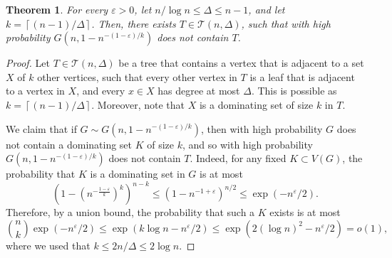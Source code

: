 \documentclass{article}
\theoremstyle{plain}
\newtheorem{theorem}{Theorem}[section]
\theoremstyle{definition}
\numberwithin{equation}{section}
\def\eps{\varepsilon}
\newcommand\ceil[1]{\left\lceil#1\right\rceil}
\newcommand\cT{\mathcal{T}}
\begin{document}


\begin{theorem}\label{thm:random}
For every $\eps>0$, let $n/\log n\leq\Delta\leq n-1$, and let $k=\ceil{(n-1)/\Delta}$. Then, there exists $T\in\cT(n,\Delta)$, such that with high probability $G(n,1-n^{-(1-\eps)/k})$ does not contain $T$.
\end{theorem}
\begin{proof}%
Let $T\in\cT(n,\Delta)$ be a tree that contains a vertex that is adjacent to a set $X$ of $k$ other vertices, such that every other vertex in $T$ is a leaf that is adjacent to a vertex in $X$, and every $x\in X$ has degree at most $\Delta$. This is possible as $k=\ceil{(n-1)/\Delta}$. Moreover, note that $X$ is a dominating set of size $k$ in $T$.

We claim that if $G\sim G(n,1-n^{-(1-\eps)/k})$, then with high probability $G$ does not contain a dominating set $K$ of size $k$, and so with high probability $G(n,1-n^{-(1-\eps)/k})$ does not contain $T$. 
Indeed, for any fixed $K\subset V(G)$, the probability that $K$ is a dominating set in $G$ is at most
\[\left(1-\left(n^{-\frac{1-\eps}k}\right)^k\right)^{n-k}\leq\left(1-n^{-1+\eps}\right)^{n/2}\leq \exp\left(-n^{\eps}/2\right).\]
Therefore, by a union bound, the probability that such a $K$ exists is at most
\[\binom{n}{k}\exp(-n^{\eps}/2)\leq\exp\left(k\log n-n^\eps/2\right)\leq\exp\left(2(\log n)^2-n^\eps/2\right)=o(1),\]
where we used that $k\leq2n/\Delta\leq2\log n$.
\end{proof}


\end{document}
